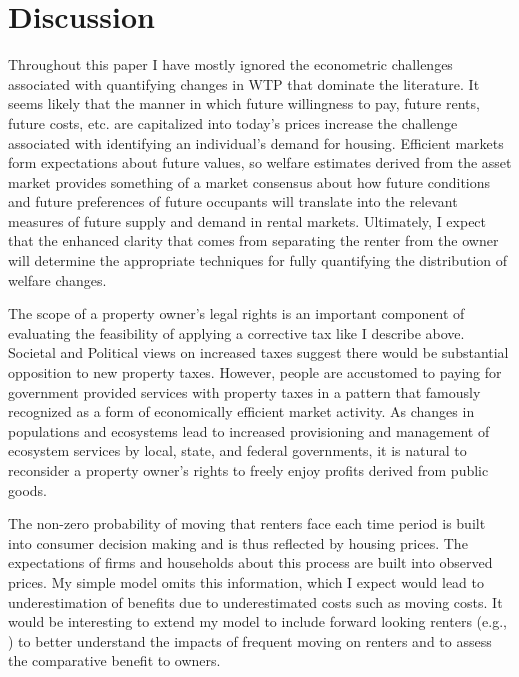 \documentclass[ecta,nameyear,draft]{econsocart}
\theoremstyle{plain}
\theoremstyle{remark}
\begin{document}
\section{Discussion}
Throughout this paper I have mostly ignored the econometric challenges associated with quantifying changes in WTP that dominate the literature. It seems likely that the manner in which future willingness to pay, future rents, future costs, etc. are capitalized into today's prices increase the challenge associated with identifying an individual's demand for housing. Efficient markets form expectations about future values, so welfare estimates derived from the asset market provides something of a market consensus about how future conditions and future preferences of future occupants will translate into the relevant measures of future supply and demand in rental markets. Ultimately, I expect that the enhanced clarity that comes from separating the renter from the owner will  determine the appropriate techniques for fully quantifying the distribution of welfare changes.

The scope of a property owner's legal rights is an important component of evaluating the feasibility of applying a corrective tax like I describe above. Societal and Political views on increased taxes suggest there would be substantial opposition to new property taxes. However, people are accustomed to paying for government provided services with property taxes in a pattern that \cite{tiebout56} famously recognized as a form of economically efficient market activity. As changes in populations and ecosystems lead to increased provisioning and management of ecosystem services by local, state, and federal governments, it is natural to reconsider a property owner's rights to freely enjoy profits derived from public goods.

The non-zero probability of moving that renters face each time period is built into consumer decision making and is thus reflected by housing prices. The expectations of firms and households about this process are built into observed prices. My simple model omits this information, which I expect would lead to underestimation of benefits due to underestimated costs such as moving costs. It would be interesting to extend my model to include forward looking renters (e.g., \cite{bishop19}) to better understand the impacts of frequent moving on renters and to assess the comparative benefit to owners.  
\end{document}
